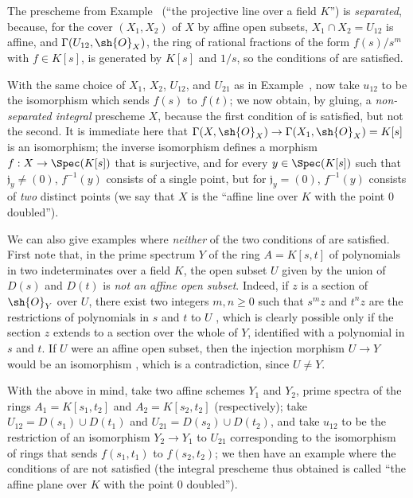 \begin{examples}[5.5.11]
\label{I.5.5.11}
The prescheme from Example~ (``the projective line over a field $K$'') is \emph{separated}, because, for the cover $(X_1,X_2)$ of $X$ by affine open subsets, $X_1\cap X_2=U_{12}$ is affine, and $\Gamma(U_{12},\sh{O}_X)$, the ring of rational fractions of the form $f(s)/s^m$ with $f\in K[s]$, is generated by $K[s]$ and $1/s$, so the conditions of  are satisfied.

With the same choice of $X_1$, $X_2$, $U_{12}$, and $U_{21}$ as in Example~, now take $u_{12}$ to be the isomorphism which sends $f(s)$ to $f(t)$;
we now obtain, by gluing, a \emph{non-separated integral} prescheme $X$, because the first condition of  is satisfied, but not the second.
It is immediate here that $\Gamma(X,\sh{O}_X)\to\Gamma(X_1,\sh{O}_X)=K[s]$ is an isomorphism;
the inverse isomorphism defines a morphism $f:X\to\Spec(K[s])$ that is surjective, and for every $y\in\Spec(K[s])$ such that $\mathfrak{j}_y\neq(0)$, $f^{-1}(y)$ consists of a single point, but for $\mathfrak{j}_y=(0)$, $f^{-1}(y)$ consists of \emph{two} distinct points (we say that $X$ is the ``affine line over $K$ with the point $0$ doubled'').

We can also give examples where \emph{neither} of the two conditions of  are satisfied.
First note that, in the prime spectrum $Y$ of the ring $A=K[s,t]$ of polynomials in two indeterminates over a field $K$, the open subset $U$ given by the union of $D(s)$ and $D(t)$ is \emph{not an affine open subset}.
Indeed, if $z$ is a section of $\sh{O}_Y$ over $U$, there exist two integers $m,n\geq0$ such that $s^mz$ and $t^nz$ are the restrictions of polynomials in $s$ and $t$ to $U$ , which is clearly possible only if the section $z$ extends to a section over the whole of $Y$, identified with a polynomial in $s$ and $t$.
If $U$ were an affine open subset, then the injection morphism $U\to Y$ would be an isomorphism , which is a contradiction, since $U\neq Y$.

With the above in mind, take two affine schemes $Y_1$ and $Y_2$, prime spectra of the rings $A_1=K[s_1,t_2]$ and $A_2=K[s_2,t_2]$ (respectively);
take $U_{12}=D(s_1)\cup D(t_1)$ and $U_{21}=D(s_2)\cup D(t_2)$, and take $u_{12}$ to be the restriction of an isomorphism $Y_2\to Y_1$ to $U_{21}$ corresponding to the isomorphism of rings that sends $f(s_1,t_1)$ to $f(s_2,t_2)$;
we then have an example where the conditions of  are not satisfied (the integral prescheme thus obtained is called ``the affine plane over $K$ with the point $0$ doubled'').
\end{examples}

